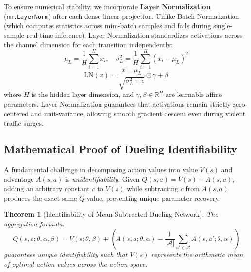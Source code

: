 \documentclass[12pt,a4paper,oneside]{report}
\newtheorem{theorem}{Theorem}[chapter]
\begin{document}
To ensure numerical stability, we incorporate \textbf{Layer Normalization} (\texttt{nn.LayerNorm}) \cite{ba2016layer} after each dense linear projection. Unlike Batch Normalization (which computes statistics across mini-batch samples and fails during single-sample real-time inference), Layer Normalization standardizes activations across the channel dimension for each transition independently:
\begin{equation}
    \mu_L = \frac{1}{H} \sum_{i=1}^H x_i, \quad \sigma_L^2 = \frac{1}{H} \sum_{i=1}^H (x_i - \mu_L)^2
\end{equation}
\begin{equation}
    \text{LN}(x) = \frac{x - \mu_L}{\sqrt{\sigma_L^2 + \epsilon}} \odot \gamma + \beta
\end{equation}
where $H$ is the hidden layer dimension, and $\gamma, \beta \in \mathbb{R}^H$ are learnable affine parameters. Layer Normalization guarantees that activations remain strictly zero-centered and unit-variance, allowing smooth gradient descent even during violent traffic surges.

\subsection{Mathematical Proof of Dueling Identifiability}
A fundamental challenge in decomposing action values into value $V(s)$ and advantage $A(s, a)$ is \emph{unidentifiability}. Given $Q(s, a) = V(s) + A(s, a)$, adding an arbitrary constant $c$ to $V(s)$ while subtracting $c$ from $A(s, a)$ produces the exact same $Q$-value, preventing unique parameter recovery.

\begin{theorem}[Identifiability of Mean-Subtracted Dueling Network]
The aggregation formula:
\begin{equation}
    Q(s, a; \theta, \alpha, \beta) = V(s; \theta, \beta) + \left( A(s, a; \theta, \alpha) - \frac{1}{|\mathcal{A}|} \sum_{a' \in \mathcal{A}} A(s, a'; \theta, \alpha) \right)
    \label{eq:dueling_identifiability_proof}
\end{equation}
guarantees unique identifiability such that $V(s)$ represents the arithmetic mean of optimal action values across the action space.
\end{theorem}
\end{document}
